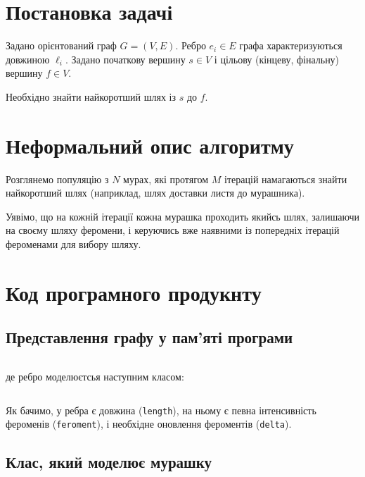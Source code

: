 \documentclass[a4paper, 12pt]{article}
\author{Скибицький Нікіта}
\date{\today}
\numberwithin{equation}{section}
\begin{document}

\people

\tableofcontents

\section{Постановка задачі}

Задано орієнтований граф $G = (V, E)$. Ребро $e_i \in E$ графа характеризуються довжиною $\ell_i$. Задано початкову вершину $s \in V$ і цільову (кінцеву, фінальну) вершину $f \in V$. \medskip

Необхідно знайти найкоротший шлях із $s$ до $f$.

\section{Неформальний опис алгоритму}

Розглянемо популяцію з $N$ мурах, які протягом $M$ ітерацій намагаються знайти найкоротший шлях (наприклад, шлях доставки листя до мурашника). \medskip

Уявімо, що на кожній ітерації кожна мурашка проходить якийсь шлях, залишаючи на своєму шляху феромени, і керуючись вже наявними із попередніх ітерацій фероменами для вибору шляху.

\section{Код програмного продукнту}

\subsection{Представлення графу у пам'яті програми}

\inputminted[firstline=64, lastline=75]{python}{../../code/salesman/main.py}

де ребро моделюєтсья наступним класом:

\inputminted[firstline=55, lastline=60]{python}{../../code/salesman/main.py}

Як бачимо, у ребра є довжина (\verb|length|), на ньому є певна інтенсивність фероменів (\verb|feroment|), і необхідне оновлення фероментів (\verb|delta|).

\subsection{Клас, який моделює мурашку}
\end{document}
